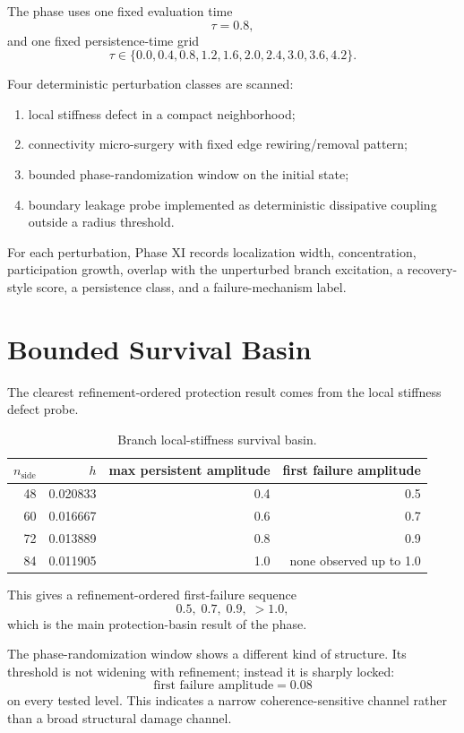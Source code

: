 \documentclass[11pt]{article}
\begin{document}
The phase uses one fixed evaluation time
\[
\tau = 0.8,
\]
and one fixed persistence-time grid
\[
\tau \in \{0.0, 0.4, 0.8, 1.2, 1.6, 2.0, 2.4, 3.0, 3.6, 4.2\}.
\]

Four deterministic perturbation classes are scanned:
\begin{enumerate}
\item local stiffness defect in a compact neighborhood;
\item connectivity micro-surgery with fixed edge rewiring/removal pattern;
\item bounded phase-randomization window on the initial state;
\item boundary leakage probe implemented as deterministic dissipative coupling outside a radius threshold.
\end{enumerate}

For each perturbation, Phase XI records localization width, concentration, participation growth, overlap with the unperturbed branch excitation, a recovery-style score, a persistence class, and a failure-mechanism label.

\section{Bounded Survival Basin}

The clearest refinement-ordered protection result comes from the local stiffness defect probe.

\begin{table}[t]
\centering
\small
\begin{tabular}{@{}rrrr@{}}
\toprule
$n_{\mathrm{side}}$ & $h$ & max persistent amplitude & first failure amplitude \\
\midrule
48 & 0.020833 & 0.4 & 0.5 \\
60 & 0.016667 & 0.6 & 0.7 \\
72 & 0.013889 & 0.8 & 0.9 \\
84 & 0.011905 & 1.0 & none observed up to 1.0 \\
\bottomrule
\end{tabular}
\caption{Branch local-stiffness survival basin.}
\label{tab:stiffness_basin}
\end{table}

This gives a refinement-ordered first-failure sequence
\[
0.5,\;0.7,\;0.9,\;>1.0,
\]
which is the main protection-basin result of the phase.

The phase-randomization window shows a different kind of structure. Its threshold is not widening with refinement; instead it is sharply locked:
\[
\text{first failure amplitude} = 0.08
\]
on every tested level. This indicates a narrow coherence-sensitive channel rather than a broad structural damage channel.
\end{document}

